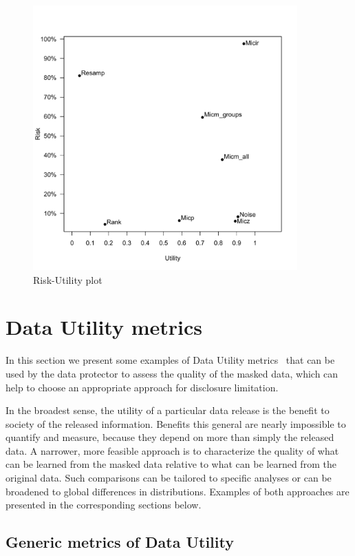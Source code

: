 \documentclass[12pt]{article}
\begin{document}
\begin{figure}
\begin{center}
\includegraphics[width=4in]{R_U_plot.pdf}
\end{center}
\caption{Risk-Utility plot}
\label{fig.ruplot}
\end{figure}



\section{ Data Utility metrics} \label{du_metrics}
In this section we present some examples of Data Utility metrics \DU\ that can be used by the data protector to assess the quality of the masked data, which can help to choose an appropriate approach for disclosure limitation.

In the broadest sense, the utility of a particular data release is the
benefit to society of the released information. Benefits this general
are nearly impossible to quantify and measure, because they depend on
more than simply the released data. A narrower, more feasible approach
is to characterize the quality of what can be learned from the masked
data relative to what can be learned from the original data. Such
comparisons can be tailored to specific analyses or can be broadened
to global differences in distributions. Examples of both approaches are presented in the corresponding sections below.

\subsection{Generic metrics of Data Utility}
\end{document}
